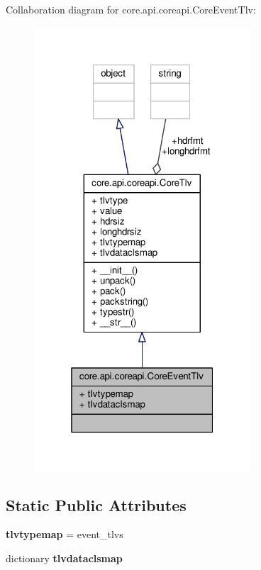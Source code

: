 Collaboration diagram for core.\+api.\+coreapi.\+Core\+Event\+Tlv\+:
\nopagebreak
\begin{figure}[H]
\begin{center}
\leavevmode
\includegraphics[width=229pt]{classcore_1_1api_1_1coreapi_1_1_core_event_tlv__coll__graph}
\end{center}
\end{figure}
\subsection*{Static Public Attributes}
\begin{DoxyCompactItemize}
\item 
\hypertarget{classcore_1_1api_1_1coreapi_1_1_core_event_tlv_a96fc8960cdf0fd14169a95283625b986}{{\bfseries tlvtypemap} = event\+\_\+tlvs}\label{classcore_1_1api_1_1coreapi_1_1_core_event_tlv_a96fc8960cdf0fd14169a95283625b986}

\item 
dictionary {\bfseries tlvdataclsmap}
\end{DoxyCompactItemize}
